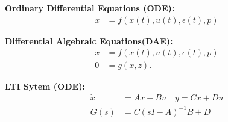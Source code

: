
\begin{tcolorbox}[colback=green!5!white,colframe=green!75!black,title=\textbf{Continuous Time Systems}]
	\textbf{Ordinary Differential Equations (ODE):}
	\begin{align*}
	\dot{ x } &= f( x(t), u(t), \epsilon(t), p)
	\end{align*}
	
	\textbf{Differential Algebraic Equations(DAE):}
	\begin{align*}
	\dot{ x } &= f( x(t), u(t), \epsilon(t), p)\\
	0 &= g(x, z).
	\end{align*}
	
	\textbf{LTI Sytem (ODE):}
	\begin{align*}
	\dot x &= Ax+Bu \quad y = Cx+Du \\
	G(s) &= C (sI-A)^{-1} B+D
	\end{align*}
\end{tcolorbox}



